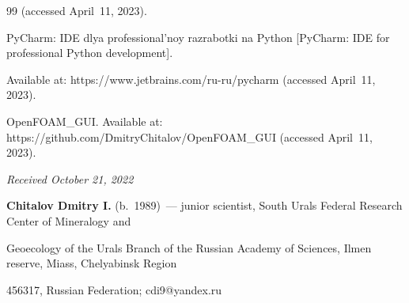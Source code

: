 {{\begin{thebibliography}{99}
(accessed April~11, 2023).




PyCharm: IDE dlya professional'noy razrabotki na Python [PyCharm: IDE for professional Python development]. 


Available at: {\sf https://www.jetbrains.com/ru-ru/pycharm} (accessed April~11, 2023).




OpenFOAM\_GUI. Available at: {\sf https://github.com/DmitryChitalov/OpenFOAM\_\linebreak GUI} (accessed April~11, 2023).


\end{thebibliography}


} }





\vspace*{-6pt}





\hfill{\small\textit{Received October 21, 2022}} 





\vspace*{-12pt} 








\Contrl





\noindent


\textbf{Chitalov Dmitry I.} (b.\ 1989)~--- junior scientist, South Urals Federal Research Center of Mineralogy and 


Geoecology of the Urals Branch of the Russian Academy of Sciences, Ilmen reserve, Miass, Chelyabinsk Region 


456317, Russian Federation; \mbox{cdi9@yandex.ru}





\label{end\stat}





\renewcommand{\bibname}{\protect\rm Литература}    


